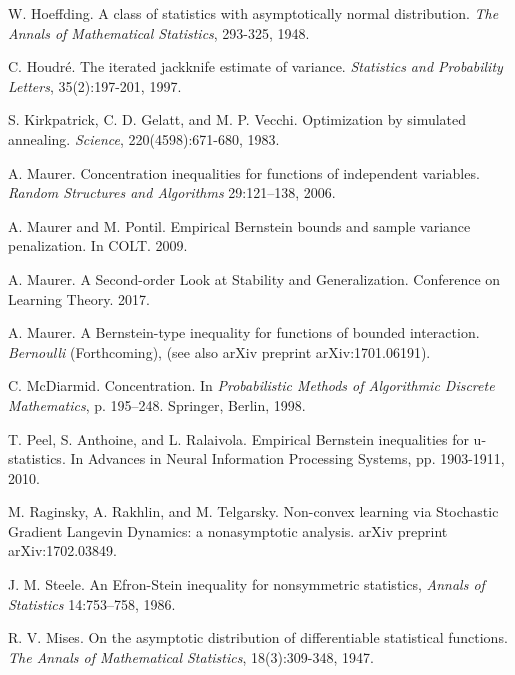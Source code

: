 \documentclass[final,12pt]{colt2018} %
\begin{document}
\begin{thebibliography}{99}
							 W. Hoeffding. A class of statistics with
							asymptotically normal distribution. \textit{The Annals of Mathematical
								Statistics}, 293-325, 1948.
							
							 C. Houdr\'{e}. The iterated jackknife
							estimate of variance. \textit{Statistics and Probability Letters}, 35(2):197-201, 1997.
							
							
							 S. Kirkpatrick, C. D. Gelatt, and M. P. Vecchi. 
							Optimization by simulated annealing. {\em Science}, 220(4598):671-680, 1983.
							
							 A. Maurer. Concentration inequalities for
							functions of independent variables. \textit{Random Structures and Algorithms 
							}29:121--138, 2006.
							
							 A. Maurer and M. Pontil. Empirical Bernstein bounds and
							sample variance penalization. In COLT. 2009.
							
							 A. Maurer. A Second-order Look at Stability and
							Generalization. Conference on Learning Theory. 2017.
							
							 A. Maurer. A Bernstein-type inequality for
							functions of bounded interaction. {\em Bernoulli} (Forthcoming), (see also arXiv preprint arXiv:1701.06191).
							
							 C. McDiarmid. Concentration. In \textit{%
								Probabilistic Methods of Algorithmic Discrete Mathematics}, p. 195--248.
							Springer, Berlin, 1998.
							
							 T. Peel, S. Anthoine, and L. Ralaivola.
							Empirical Bernstein inequalities for u-statistics. In Advances in Neural
							Information Processing Systems, pp. 1903-1911, 2010.
							
							 M. Raginsky, A. Rakhlin,  and M. Telgarsky. Non-convex learning via Stochastic Gradient Langevin Dynamics: a nonasymptotic analysis. arXiv preprint arXiv:1702.03849.
							
							 J. M. Steele. An Efron-Stein inequality for
							nonsymmetric statistics, \textit{Annals of Statistics} 14:753--758, 1986.
							
							 R. V. Mises. On the asymptotic distribution of
							differentiable statistical functions. \textit{The Annals of Mathematical
								Statistics}, 18(3):309-348, 1947.
						\end{thebibliography}
\end{document}
